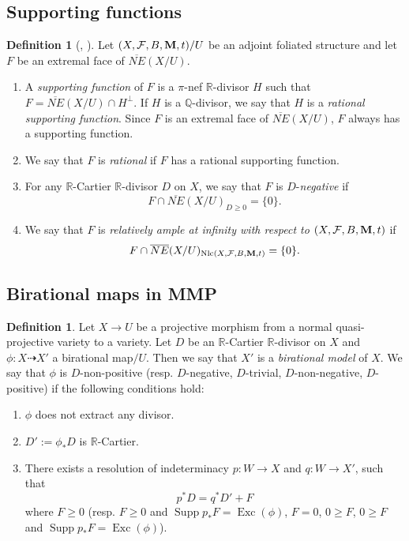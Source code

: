 \documentclass[12pt]{amsart}
\numberwithin{equation}{section}
\newcommand{\Mm}{{\bf{M}}}
\newcommand{\Qq}{\mathbb{Q}}
\newcommand{\Rr}{\mathbb{R}}
\newcommand{\Exc}{\operatorname{Exc}}
\newcommand{\Supp}{\operatorname{Supp}}
\newcommand{\Nlc}{\operatorname{Nlc}}
\newcommand{\Ff}{\mathcal{F}}
\theoremstyle{definition}
\newtheorem{defn}[thm]{Definition}
\theoremstyle{definition}
\theoremstyle{definition}
\begin{document}
\subsection{Supporting functions}

\begin{defn}[{\cite[Definition 5.3]{Amb03}, \cite[Definition 6.7.2]{Fuj11}}]\label{defn: basics of cone theorem}
Let $(X,\Ff,B,\Mm,t)/U$ be an adjoint foliated structure and let $F$ be an extremal face of $\overline{NE}(X/U)$.
\begin{enumerate}
    \item A \emph{supporting function} of $F$ is a  $\pi$-nef $\Rr$-divisor $H$ such that $F=\overline{NE}(X/U)\cap H^{\bot}$. If $H$ is a $\Qq$-divisor, we say that $H$ is a \emph{rational supporting function}. Since $F$ is an extremal face of $\overline{NE}(X/U)$, $F$ always has a supporting function.
    \item We say that $F$ is \emph{rational} if $F$ has a rational supporting function.
    \item For any $\Rr$-Cartier $\Rr$-divisor $D$ on $X$, we say that $F$ is $D$-\emph{negative} if $$F\cap\overline{NE}(X/U)_{D\geq 0}=\{0\}.$$
    \item We say that $F$ is \emph{relatively ample at infinity with respect to} $(X,\Ff,B,\Mm,t)$  if $$F\cap\overline{NE}(X/U)_{\Nlc(X,\Ff,B,\Mm,t)}=\{0\}.$$
\end{enumerate}
\end{defn}


\subsection{Birational maps in MMP}

\begin{defn}
    Let $X\rightarrow U$ be a projective morphism from a normal quasi-projective variety to a variety.  Let $D$ be an $\Rr$-Cartier $\Rr$-divisor on $X$ and $\phi: X\dashrightarrow X'$ a birational map$/U$. Then we say that $X'$ is a \emph{birational model} of $X$. We say that $\phi$ is $D$-non-positive (resp. $D$-negative, $D$-trivial, $D$-non-negative, $D$-positive) if the following conditions hold:
    \begin{enumerate}
    \item $\phi$ does not extract any divisor.
    \item $D':=\phi_\ast D$ is $\Rr$-Cartier.
    \item There exists a resolution of indeterminacy $p: W\rightarrow X$ and $q: W\rightarrow X'$, such that
    $$p^\ast D=q^\ast D'+F$$
    where $F\geq 0$ (resp. $F\geq 0$ and $\Supp p_\ast F=\Exc(\phi)$, $F=0$, $0\geq F$, $0\geq F$ and $\Supp p_\ast F=\Exc(\phi)$).
    \end{enumerate}
\end{defn}
\end{document}
